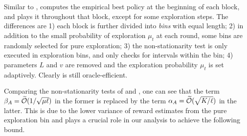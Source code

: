 

Similar to \AdaEG, \AdaBIN computes the empirical best policy at the beginning of each block, and plays it throughout that block, except for some exploration steps. 
The differences are 1) each block is further divided into {\it bins} with equal length; 
2) in addition to the small probability of exploration $\mu_t$ at each round, some bins are randomly selected for pure exploration;
3) the non-stationarity test is only executed in exploration bins, and only checks for intervals within the bin;
4) parameters $L$ and $v$ are removed and the exploration probability $\mu_t$ is set adaptively.
Clearly \AdaBIN is still oracle-efficient.

Comparing the non-stationarity tests of \AdaEG and \AdaBIN, 
one can see that the term $\beta_A = \widetilde{\mathcal{O}}(1/\sqrt{\mu\ell})$ in the former is replaced by the term $\alpha_A = \widetilde{\mathcal{O}}(\sqrt{K/\ell})$ in the latter.
This is due to the lower variance of reward estimates from the pure exploration bin and plays a crucial role in our analysis to achieve the following bound.


